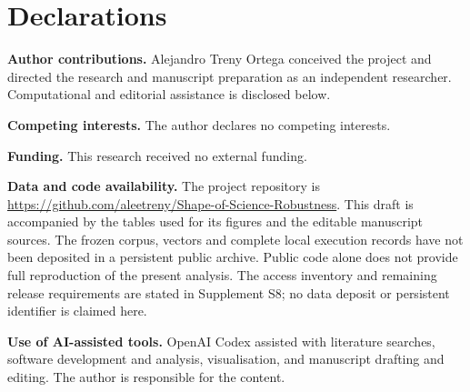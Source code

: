 \documentclass[12pt]{article}
\begin{document}
\section*{Declarations}
\textbf{Author contributions.}
Alejandro Treny Ortega conceived the project and directed the research and manuscript preparation as an independent researcher. Computational and editorial assistance is disclosed below.
\par\medskip
\textbf{Competing interests.}
The author declares no competing interests.
\par\medskip
\textbf{Funding.}
This research received no external funding.
\par\medskip
\textbf{Data and code availability.}
The project repository is \url{https://github.com/aleetreny/Shape-of-Science-Robustness}. This draft is accompanied by the tables used for its figures and the editable manuscript sources. The frozen corpus, vectors and complete local execution records have not been deposited in a persistent public archive. Public code alone does not provide full reproduction of the present analysis. The access inventory and remaining release requirements are stated in Supplement S8; no data deposit or persistent identifier is claimed here.
\par\medskip
\textbf{Use of AI-assisted tools.}
OpenAI Codex assisted with literature searches, software development and analysis, visualisation, and manuscript drafting and editing. The author is responsible for the content.



\end{document}
